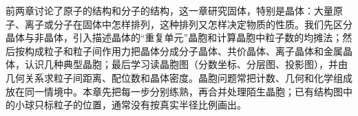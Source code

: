 \documentclass[UTF8,a4paper,zihao=5,oneside,openany,fontset=none]{ctexbook}
\newcommand{\tu}[2]{\par\smallskip\noindent\begin{minipage}{\linewidth}\centering\color{black}#1\par\captionof{figure}{#2}\end{minipage}\par\smallskip\color{black}}
\begin{document}
\newcommand{\ceightcube}[1][black]{%
 \draw[#1] (0,0,0)--(1,0,0)--(1,0,1)--(0,0,1)--cycle;
 \draw[#1] (1,0,0)--(1,1,0)--(1,1,1)--(1,0,1);
 \draw[#1] (0,0,1)--(0,1,1)--(1,1,1);
 \draw[#1,dashed] (0,0,0)--(0,1,0)--(1,1,0);
 \draw[#1,dashed] (0,1,0)--(0,1,1);}
\newcommand{\ceightball}[3][0.13]{\shade[ball color=#2] (#3) circle (#1cm);}
\newcommand{\ceightV}{{0,0,0},{1,0,0},{0,1,0},{1,1,0},{0,0,1},{1,0,1},{0,1,1},{1,1,1}}
\newcommand{\ceightF}{{0.5,0.5,0},{0.5,0.5,1},{0.5,0,0.5},{0.5,1,0.5},{0,0.5,0.5},{1,0.5,0.5}}
\newcommand{\ceightE}{{0.5,0,0},{0.5,1,0},{0.5,0,1},{0.5,1,1},{0,0.5,0},{1,0.5,0},{0,0.5,1},{1,0.5,1},{0,0,0.5},{1,0,0.5},{0,1,0.5},{1,1,0.5}}
\newcommand{\ceightT}{{0.25,0.25,0.25},{0.75,0.75,0.25},{0.75,0.25,0.75},{0.25,0.75,0.75}}
\newcommand{\ceightTT}{{0.75,0.25,0.25},{0.25,0.75,0.25},{0.25,0.25,0.75},{0.75,0.75,0.75}}
\newcommand{\ceightcotwo}[2]{%
 \draw[line width=1.3pt,black!55] ($(#1)-(#2)$)--($(#1)+(#2)$);
 \shade[ball color=warnred!80] ($(#1)-(#2)$) circle (0.055cm);
 \shade[ball color=warnred!80] ($(#1)+(#2)$) circle (0.055cm);
 \shade[ball color=black!60] (#1) circle (0.06cm);}
\newcommand{\ceighttu}[2]{\par\noindent\begin{minipage}{\linewidth}\tu{#1}{#2}\end{minipage}\par}
\newcommand{\ceightleg}[4][0.1]{\shade[ball color=#3] (#2) circle (#1cm); \node[right,font=\scriptsize] at (#2) {\hspace{0.6ex}#4};}

前两章讨论了原子的结构和分子的结构，这一章研究固体，特别是晶体：大量原子、离子或分子在固体中怎样排列，这种排列又怎样决定物质的性质。我们先区分晶体与非晶体，引入描述晶体的“重复单元”晶胞和计算晶胞中粒子数的均摊法；然后按构成粒子和粒子间作用力把晶体分成分子晶体、共价晶体、离子晶体和金属晶体，认识几种典型晶胞；最后学习读晶胞图（分数坐标、分层图、投影图），并由几何关系求粒子间距离、配位数和晶体密度。晶胞问题常把计数、几何和化学组成放在同一情境中。本章先把每一步分别练熟，再合并处理陌生晶胞；已有结构图中的小球只标粒子的位置，通常没有按真实半径比例画出。
\end{document}
